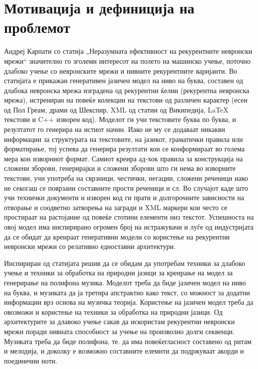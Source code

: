 \chapter{Мотивација и дефиниција на проблемот}
\label{ch:motivacija}

Андреј Карпати со статија „Неразумната ефективност на рекурентните невронски мрежи“ \cite{AndrejKarpathy2015} значително го зголеми интересот на полето на машинско учење, поточно длабоко учење со невронските мрежи и нивните рекурентните варијанти. Во статијата е прикажан генеративен јазичен модел на ниво на буква, составен од длабока невронска мрежа изградена од рекурентни ќелии (рекурентна невронска мрежа), истрениран на повеќе колекции на текстови од различен карактер (есеи од Пол Греам, драми од Шекспир, XML од статии од Википедија, LaTeX текстови и C++ изворен код). Моделот ги учи текстовите буква по буква, и резултатот го генерира на истиот начин. Иако не му се додаваат никакви информации за структурата на текстовите, на јазикот, граматички правила или форматирање, тој успева да генерира резултати кои се конформираат во голема мера кон изворниот формат. Самиот креира ад-хок правила за конструкција на сложени зборови, генерирајки и сложени зборови што ги нема во изворните текстови, учи употреба на сврзници, честички, негации, сложени реченици иако не секогаш се поврзани составните прости реченици и сл. Во случајот каде што учи технички документи и изворен код ги прати и долгорочните зависности на отворање и соодветно затворења на загради и XML маркери кои често се простираат на растојание од повеќе стотини елементи низ текстот. Успешноста на овој модел има инспирирано огромен број на истражувачи и луѓе од индустријата да се обидат да креираат генеративни модели со користење на рекурентни невронски мрежи со релативно едноставни архитектури. 

Инспириран од статијата решив да се обидам да употребам техники за длабоко учење и техники за обработка на природни јазици за креирање на модел за генерирање на полифона музика. Моделот треба да биде јазичен модел на ниво на буква, и музиката да ја третира апстрактно како текст, со можност за додатни информации врз основа на музичка теорија. Користење на јазичен модел треба да овозможи и користење на техники за обработка на природни јазици. Од архитектурите за длавоко учење сакав да искористам рекурентни невронски мрежи поради нивната способност за учење на произволно долги секвенци. Музиката треба да биде полифона, те. да има повеќегласност составено од ритам и мелодија, и доколку е возможно составните елемнти да подржуваат акорди и поединечни ноти.

